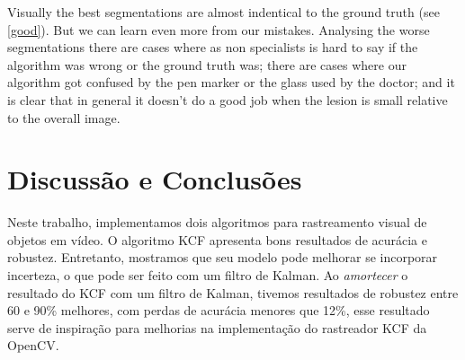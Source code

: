 \documentclass[conference]{IEEEtran}
\begin{document}
Visually the best segmentations are almost indentical to the ground truth (see \ref{good}). But we can learn even more from our mistakes. Analysing the worse segmentations there are cases where as non specialists is hard to say if the algorithm was wrong or the ground truth was; there are cases where our algorithm got confused by the pen marker or the glass used by the doctor; and it is clear that in general it doesn't do a good job when the lesion is small relative to the overall image. 




\section{Discussão e Conclusões}
Neste trabalho, implementamos dois algoritmos para rastreamento visual de objetos em vídeo. O algoritmo KCF apresenta bons resultados de acurácia e robustez.  Entretanto, mostramos que seu modelo pode melhorar se incorporar incerteza, o que pode ser feito com um filtro de Kalman. Ao \textit{amortecer}  o resultado do KCF com um filtro de Kalman, tivemos resultados de robustez entre 60 e 90\% melhores, com perdas de acurácia menores que 12\%, esse resultado serve de inspiração para melhorias na implementação do rastreador KCF da OpenCV. 




\end{document}
